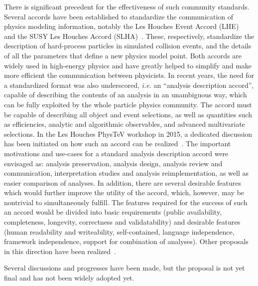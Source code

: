 \documentclass[11pt]{cernrep}
\begin{document}
There is significant precedent for the effectiveness of such community standards. Several
accords have been established to standardize the communication of physics modeling information,
notably the Les Houches Event Accord (LHE)~\cite{Boos:2001cv,Alwall:2006yp} and the SUSY Les Houches Accord (SLHA)~\cite{Allanach:2008qq,Skands:2003cj}.
These, respectively, standardize the description of hard-process
particles in simulated collision events, and the details of all the parameters that define a new physics model point.
Both accords are widely used in high-energy physics and have greatly helped to
simplify and make more efficient the communication between physicists.
In recent years, the need for a standardized format was also underscored,
{\it i.e.} an “analysis description
accord”, capable of describing the contents of an analysis in an unambiguous way, which can
be fully exploited by the whole particle physics community.  The accord must be capable of
describing all object and event selections, as well as quantities such as efficiencies, analytic and
algorithmic observables, and advanced multivariate selections.
In the Les Houches PhysTeV workshop in 2015, a dedicated discussion has been initiated
on how such an accord can be realized~\cite{Brooijmans:2016vro}.
The important motivations and use-cases for a standard analysis description accord were envisaged as:
analysis preservation, analysis design, analysis review and communication, interpretation studies and analysis reimplementation, as well as easier comparison of analyses.
In addition, there are several desirable features which would further improve the utility
of the accord, which, however, may be nontrivial to simultaneously fulfill.  
The features required for the success of such an accord would be divided into basic requirements (public availability, completeness, longevity, correctness and validatability) and desirable features (human readability and writeability, self-contained, language independence, framework independence, support for combination of analyses).
Other proposals in this direction have been realized~\cite{Collaboration:2242860,recasting_atlas}.

Several discussions and progresses have been made, but the proposal is not yet final and has not been widely adopted yet.

\end{document}
